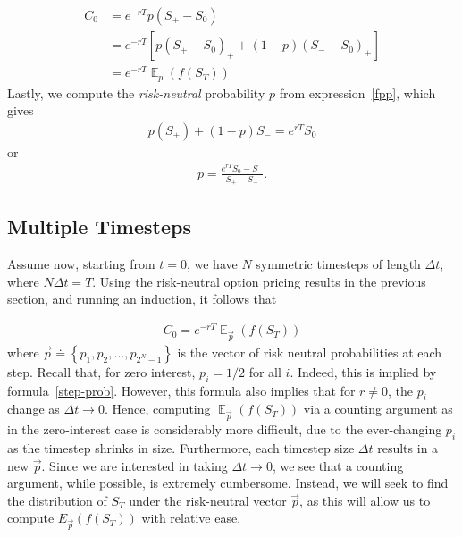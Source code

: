 \documentclass[12pt]{article}
\DeclareMathOperator{\ex}{\mathbb{E}}
\theoremstyle{plain}
\theoremstyle{definition}
\theoremstyle{remark}
\numberwithin{equation}{section}  %
\begin{document}
\begin{equation*}
	\begin{split}
		C_{0} &= e^{-rT} p (S_{+} - S_{0})
		\\
		& = e^{-rT}\left[ p {(S_{+} - S_{0})}_{+}+(1-p){(S_{-} - S_{0})}_{+}\right]
		\\
		& = e^{-rT} \ex_{p}(f(S_{T}))
	\end{split}
\end{equation*}
Lastly, we compute the \emph{risk-neutral} probability $p$ from expression~\eqref{fpp}, which gives
\begin{equation*}
	\begin{split}
		p(S_{+}) + (1 -p)S_{-} = e^{rT} S_{0}
	\end{split}
\end{equation*}
or
\begin{equation}\label{step-prob}
	\begin{split}
		p = \frac{e^{rT} S_{0} - S_{-}}{S_{+} - S_{-}}.
	\end{split}
\end{equation}
\subsection{Multiple Timesteps}
Assume now, starting from $t=0$,
we have $N$ symmetric timesteps of length $\Delta t$, where
$N \Delta t  = T$. Using the risk-neutral option pricing
results in the previous section, and running an induction,
it follows that 

\begin{equation}\label{ui}
	\begin{split}
		C_{0} = e^{-rT} \ex_{\vec{p}}(f(S_{T}))
	\end{split}
\end{equation}
where $\vec{p} \doteq \left\{ p_{1}, p_{2}, \ldots, p_{2^{N} -1} \right\}$
is the vector of risk neutral probabilities at each step.
Recall that, for zero interest, 
$p_{i} = 1/2$ for all $i$. Indeed, this is implied by
formula~\eqref{step-prob}. However, this formula also implies that
for $r \neq 0$, the $p_i$ change as $\Delta t \to 0$. 
Hence, computing $\ex_{\vec{p}}(f(S_{T}))$ via a counting argument as
in the zero-interest case is considerably more difficult, due to the
ever-changing $p_i$ as the timestep shrinks in size. Furthermore,
each timestep size $\Delta t$ results in a new $\vec{p}$.
Since we are interested in taking $\Delta t \to 0$, we see that a counting
argument, while possible, is extremely cumbersome.
Instead, we will seek to find the distribution of $S_{T}$ under
the risk-neutral vector $\vec{p}$, as this will allow us to compute
$E_{\vec{p}} (f(S_{T}))$ with relative ease. 
\end{document}
